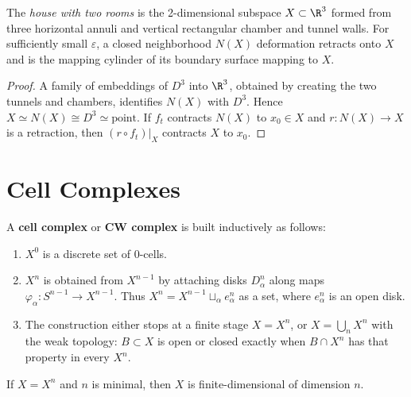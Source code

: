 \begin{example}
\label{ex:house-with-two-rooms-contractible}
The \textit{house with two rooms} is the 2-dimensional subspace $X\subset\R^3$
formed from three horizontal annuli and vertical rectangular chamber and tunnel walls.
For sufficiently small $\varepsilon$, a closed neighborhood $N(X)$ deformation retracts
onto $X$ and is the mapping cylinder of its boundary surface mapping to $X$.
\end{example}

\begin{proof}
\sketch A family of embeddings of $D^3$ into $\R^3$, obtained by creating the two
tunnels and chambers, identifies $N(X)$ with $D^3$. Hence
$X\simeq N(X)\cong D^3\simeq\text{point}$. If $f_t$ contracts $N(X)$ to
$x_0\in X$ and $r:N(X)\to X$ is a retraction, then $(r\circ f_t)|_X$ contracts
$X$ to $x_0$.
\end{proof}

\section{Cell Complexes}
\label{sec:cell-complexes}

\begin{definition}[CW complex]
\label{def:cell-complex}
\leanok
A \textbf{cell complex} or \textbf{CW complex} is built inductively as follows:
\begin{enumerate}
\item[(1)] $X^0$ is a discrete set of 0-cells.
\item[(2)] $X^n$ is obtained from $X^{n-1}$ by attaching disks $D^n_\alpha$ along
maps $\varphi_\alpha:S^{n-1}\to X^{n-1}$. Thus
$X^n=X^{n-1}\sqcup_\alpha e^n_\alpha$ as a set, where $e^n_\alpha$ is an open disk.
\item[(3)] The construction either stops at a finite stage $X=X^n$, or
$X=\bigcup_nX^n$ with the weak topology: $B\subset X$ is open or closed exactly
when $B\cap X^n$ has that property in every $X^n$.
\end{enumerate}
\end{definition}

\begin{definition}
\label{def:dimension-cw-complex}
\leanok
{}
If $X=X^n$ and $n$ is minimal, then $X$ is finite-dimensional of dimension $n$.
\end{definition}

